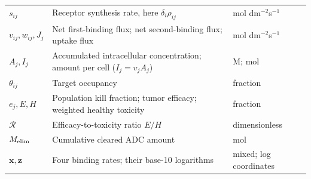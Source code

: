 \documentclass[11pt,a4paper]{article}
\begin{document}
\begin{longtable}{p{.22\linewidth}p{.47\linewidth}p{.25\linewidth}}
$s_{ij}$ & Receptor synthesis rate, here $\delta_i\rho_{ij}$ & mol dm$^{-2}$s$^{-1}$\\
$v_{ij},w_{ij},J_j$ & Net first-binding flux; net second-binding flux; uptake flux & mol dm$^{-2}$s$^{-1}$\\
$A_j,I_j$ & Accumulated intracellular concentration; amount per cell ($I_j=v_jA_j$) & M; mol\\
$\theta_{ij}$ & Target occupancy & fraction\\
$e_j,E,H$ & Population kill fraction; tumor efficacy; weighted healthy toxicity & fraction\\
$\mathcal R$ & Efficacy-to-toxicity ratio $E/H$ & dimensionless\\
$M_{\rm elim}$ & Cumulative cleared ADC amount & mol\\
$\boldsymbol x,\boldsymbol z$ & Four binding rates; their base-10 logarithms & mixed; log coordinates\\
\bottomrule
\end{longtable}
\end{document}
